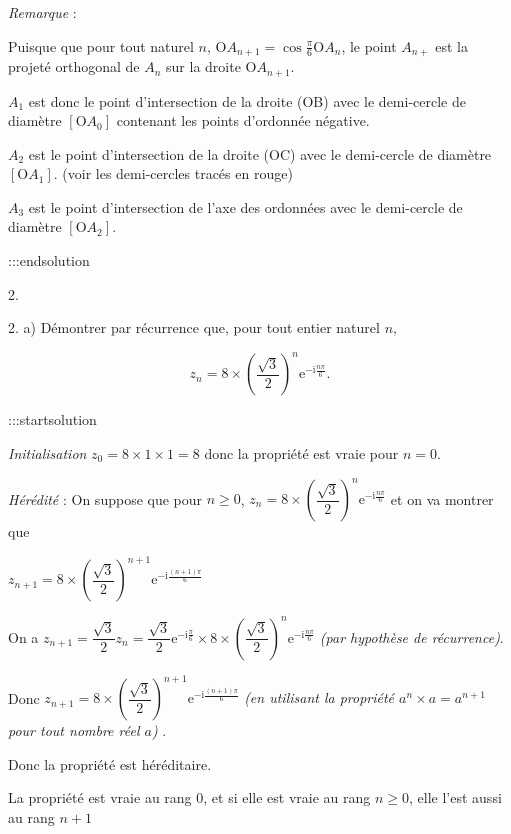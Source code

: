 \documentclass{cornouaille}
\begin{document}
\smallskip

\emph{Remarque} :

Puisque que pour tout naturel $n$, \: O$A_{n+1} = \cos \frac{\pi}{6} \text{O}A_n$, le point $A_{n+}$ est la projeté orthogonal de $A_n$ sur la droite O$A_{n+1}$.

$A_1$ est donc le point d'intersection de la droite (OB) avec le demi-cercle de diamètre $\left[\text{O}A_0\right]$ contenant les points d'ordonnée négative.

$A_2$ est le point d'intersection de la droite (OC) avec le demi-cercle de diamètre $\left[\text{O}A_1\right]$. (voir les demi-cercles tracés en rouge)

$A_3$ est le point d'intersection de l'axe des ordonnées  avec le demi-cercle de diamètre $\left[\text{O}A_2\right]$.


:::endsolution




2. 




2. a)  Démontrer par récurrence que, pour tout entier naturel $n$,


$$
z_n = 8 \times \left(\dfrac{\sqrt{3}}{2}\right)^n \text{e}^{- \text{i}\frac{n\pi}{6}}.
$$



:::startsolution

\emph{Initialisation} $z_0 = 8 \times 1 \times 1 = 8$ donc la propriété est vraie pour $n=0$.\smallskip

\emph{Hérédité} : On suppose que pour $n \geqslant 0$,  $z_n=8 \times \left( \dfrac{\sqrt{3}}{2} \right)^n \text{e}^{-\text{i} \frac{n\pi}{6}}$ et on va montrer que

$z_{n+1} = 8 \times \left( \dfrac{\sqrt{3}}{2} \right)^{n+1} \text{e}^{-\text{i} \frac{(n+1)\pi}{6}}$\medskip

On a $z_{n+1}= \dfrac{\sqrt{3}}{2} z_n= \dfrac{\sqrt{3}}{2}\text{e}^{-\text{i} \frac{\pi}{6}} \times 8\times \left( \dfrac{\sqrt{3}}{2} \right)^n \text{e}^{-\text{i} \frac{n\pi}{6}}$ \textit{(par hypothèse de récurrence)}.\smallskip

Donc $z_{n+1}=8 \times \left( \dfrac{\sqrt{3}}{2} \right)^{n+1} \text{e}^{-\text{i} \frac{(n+1)\pi}{6}}$ \textit{ (en utilisant la propriété $a^n \times a = a^{n+1}$ pour tout nombre réel $a$) }.\smallskip

Donc la propriété est héréditaire.\smallskip

La propriété est vraie au rang $0$, et si elle est vraie au rang $n \geqslant 0$, elle l'est aussi au rang $n + 1$
\end{document}
